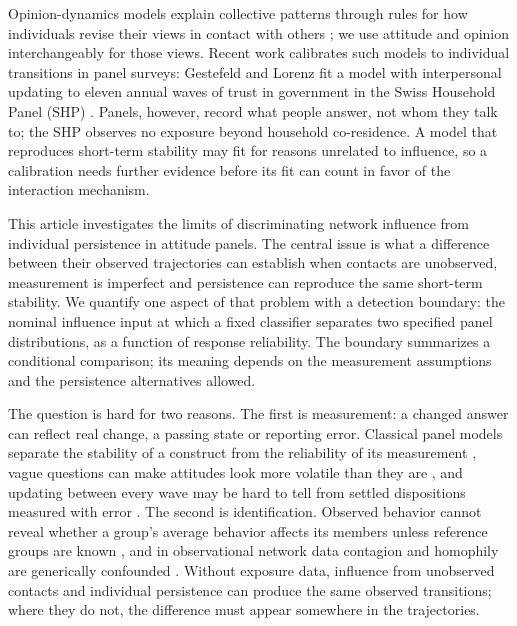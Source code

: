 Opinion-dynamics models explain collective patterns through rules for how individuals revise their views in contact with others \cite{flache2017}; we use attitude and opinion interchangeably for those views. Recent work calibrates such models to individual transitions in panel surveys: Gestefeld and Lorenz fit a model with interpersonal updating to eleven annual waves of trust in government in the Swiss Household Panel (SHP) \cite{gestefeld2023}. Panels, however, record what people answer, not whom they talk to; the SHP observes no exposure beyond household co-residence. A model that reproduces short-term stability may fit for reasons unrelated to influence, so a calibration needs further evidence before its fit can count in favor of the interaction mechanism.

This article investigates the limits of discriminating network influence from individual persistence in attitude panels. The central issue is what a difference between their observed trajectories can establish when contacts are unobserved, measurement is imperfect and persistence can reproduce the same short-term stability. We quantify one aspect of that problem with a detection boundary: the nominal influence input at which a fixed classifier separates two specified panel distributions, as a function of response reliability. The boundary summarizes a conditional comparison; its meaning depends on the measurement assumptions and the persistence alternatives allowed.

The question is hard for two reasons. The first is measurement: a changed answer can reflect real change, a passing state or reporting error. Classical panel models separate the stability of a construct from the reliability of its measurement \cite{heise1969}, vague questions can make attitudes look more volatile than they are \cite{achen1975}, and updating between every wave may be hard to tell from settled dispositions measured with error \cite{kiley2020}. The second is identification. Observed behavior cannot reveal whether a group's average behavior affects its members unless reference groups are known \cite{manski1993}, and in observational network data contagion and homophily are generically confounded \cite{shalizi2011}. Without exposure data, influence from unobserved contacts and individual persistence can produce the same observed transitions; where they do not, the difference must appear somewhere in the trajectories.


